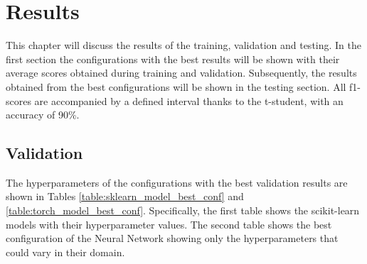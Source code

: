 \documentclass[../main]{subfiles}
\begin{document}
\chapter{Results}
This chapter will discuss the results of the training, validation and testing.
In the first section the configurations with the best results will be shown with their average scores obtained during training and validation.
Subsequently, the results obtained from the best configurations will be shown in the testing section.
All f1-scores are accompanied by a defined interval thanks to the t-student, with an accuracy of 90\%.

\section{Validation}
The hyperparameters of the configurations with the best validation results are shown in Tables \ref{table:sklearn_model_best_conf} and \ref{table:torch_model_best_conf}.
Specifically, the first table shows the scikit-learn models with their hyperparameter values.
The second table shows the best configuration of the Neural Network showing only the hyperparameters that could vary in their domain.
\end{document}

